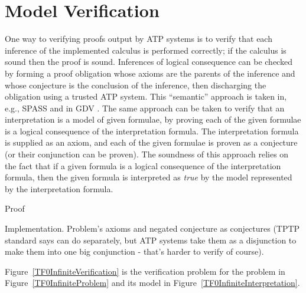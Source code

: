 \documentclass[letterpaper]{article}
\begin{document}

\section{Model Verification}
\label{Verification}

One way to verifying proofs output by ATP systems is to verify that each inference of the
implemented calculus is performed correctly; if the calculus is sound then the proof is
sound.
Inferences of logical consequence can be checked by forming a proof obligation whose axioms
are the parents of the inference and whose conjecture is the conclusion of the inference,
then discharging the obligation using a trusted ATP system. 
This ``semantic'' approach is taken in, e.g., SPASS \cite{WF+09} and in GDV \cite{Sut06}.
The same approach can be taken to verify that an interpretation is a model of given formulae, 
by proving each of the given formulae is a logical consequence of the interpretation formula.
The interpretation formula is supplied as an axiom, and each of the given formulae is proven
as a conjecture (or their conjunction can be proven).
The soundness of this approach relies on the fact that if a given formula is a logical consequence 
of the interpretation formula, then the given formula is interpreted as {\em true} by the model 
represented by the interpretation formula.

Proof

Implementation.
Problem's axioms and negated conjecture as conjectures (TPTP standard says can do separately,
but ATP systems take them as a disjunction to make them into one big conjunction - that's
harder to verify of course).

Figure~\ref{TF0InfiniteVerification} is the verification problem for the problem in 
Figure~\ref{TF0InfiniteProblem} and its model in Figure~\ref{TF0InfiniteInterpretation}.
\end{document}
